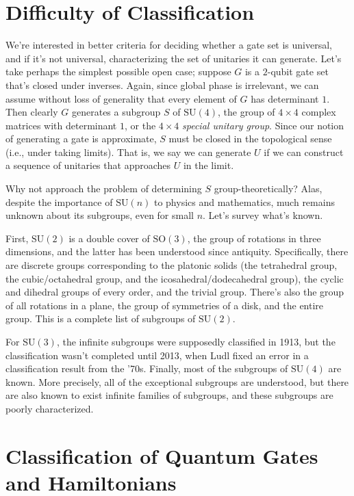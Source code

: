 \documentclass[12pt]{report}
\theoremstyle{plain}
\theoremstyle{definition}
\begin{document}
\section{Difficulty of Classification}

We're interested in better criteria for deciding whether a gate set is universal, and if it's not universal, characterizing the set of unitaries it can generate. Let's take perhaps the simplest possible open case; suppose $G$ is a $2$-qubit gate set that's closed under inverses.  Again, since global phase is irrelevant, we can assume without loss of generality that every element of $G$ has determinant $1$.  Then clearly $G$ generates a subgroup $S$ of $\mathrm{SU}(4)$, the group of $4 \times 4$ complex matrices with determinant $1$, or the $4\times 4$ \emph{special unitary group}. Since our notion of generating a gate is approximate, $S$ must be closed in the topological sense (i.e., under taking limits). That is, we say we can generate $U$ if we can construct a sequence of unitaries that approaches $U$ in the limit.

Why not approach the problem of determining $S$ group-theoretically?  Alas, despite the importance of $\mathrm{SU}(n)$ to physics and mathematics, much remains unknown about its subgroups, even for small $n$. Let's survey what's known.

First, $\mathrm{SU}(2)$ is a double cover of $\mathrm{SO}(3)$, the group of rotations in three dimensions, and the latter has been understood since antiquity. Specifically, there are discrete groups corresponding to the platonic solids (the tetrahedral group, the cubic/octahedral group, and the icosahedral/dodecahedral group), the cyclic and dihedral groups of every order, and the trivial group. There's also the group of all rotations in a plane, the group of symmetries of a disk, and the entire group. This is a complete list of subgroups of $\mathrm{SU}(2)$.

For $\mathrm{SU}(3)$, the infinite subgroups were supposedly classified in 1913, but the classification wasn't completed until 2013, when Ludl fixed an error in a classification result from the '70s. Finally, most of the subgroups of $\mathrm{SU}(4)$ are known. More precisely, all of the exceptional subgroups are understood, but there are also known to exist infinite families of subgroups, and these subgroups are poorly characterized.

\section{Classification of Quantum Gates and Hamiltonians}
\end{document}
